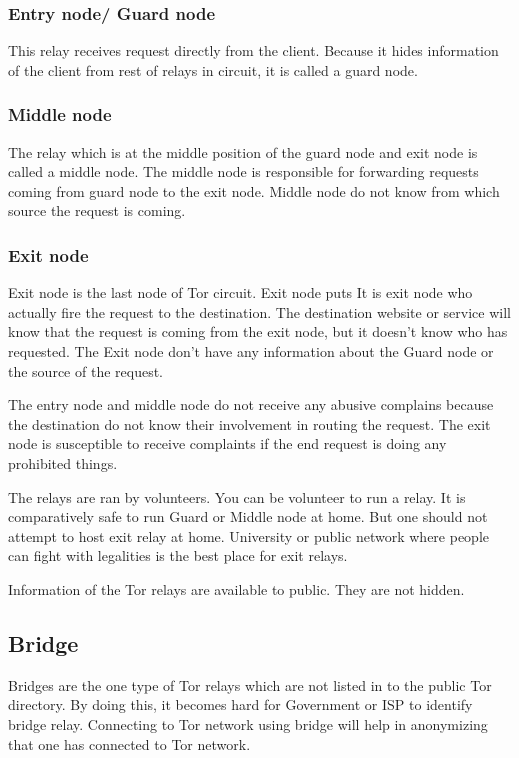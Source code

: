 \documentclass{article}
\begin{document}
      \subsubsection{Entry node/ Guard node}
        This relay receives request directly from the client. Because it hides
        information of the client from rest of relays in circuit, it is called
        a guard node.

      \subsubsection{Middle node}
        The relay which is at the middle position of the guard node and exit
        node is called a middle node. The middle node is responsible for
        forwarding requests coming from guard node to the exit node. Middle
        node do not know from which source the request is coming.

      \subsubsection{Exit node}
        Exit node is the last node of Tor circuit. Exit node puts It is exit
        node who actually fire the request to the destination. The destination
        website or service will know that the request is coming from the exit
        node, but it doesn't know who has requested. The Exit node don't have
        any information about the Guard node or the source of the request.


      The entry node and middle node do not receive any abusive complains
      because the destination do not know their involvement in routing the
      request. The exit node is susceptible to receive complaints if the end
      request is doing any prohibited things.

      The relays are ran by volunteers. You can be volunteer to run a relay.
      It is comparatively safe to run Guard or Middle node at home. But one
      should not attempt to host exit relay at home. University or public
      network where people can fight with legalities is the best place for exit
      relays.

      Information of the Tor relays are available to public. They are not
      hidden.

    \subsection{Bridge}
      Bridges are the one type of Tor relays which are not listed in to the
      public Tor directory. By doing this, it becomes hard for Government or
      ISP to identify bridge relay. Connecting to Tor network using bridge will
      help in anonymizing that one has connected to Tor network.
\end{document}
